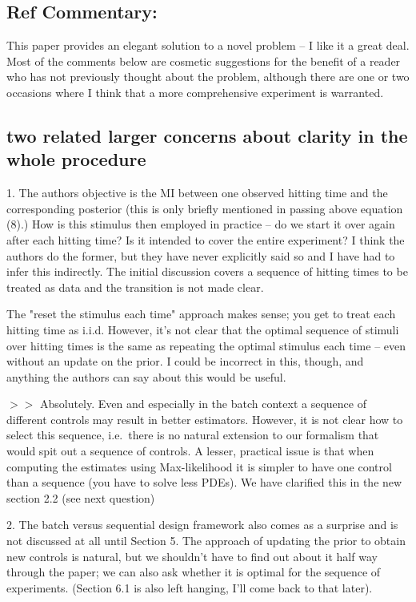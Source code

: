 \documentclass[12pt]{article}
\begin{document}
\subsection{Ref Commentary:}
 This paper provides an elegant solution to a novel problem -- I like it a great
 deal. Most of the comments below are cosmetic suggestions for the benefit of a
 reader who has not previously thought about the problem, although there are one
 or two occasions where I think that a more comprehensive experiment is
 warranted.
 
\subsection{two related larger concerns about clarity in the whole
procedure}

1. The authors objective is the MI between one observed hitting time and
the corresponding posterior (this is only briefly mentioned in passing
above equation (8).) How is this stimulus then employed in practice --
do we start it over again after each hitting time? Is it intended to
cover the entire experiment? I think the authors do the former, but they
have never explicitly said so and I have had to infer this indirectly.
The initial discussion covers a sequence of hitting times to be treated
as data and the transition is not made clear.

The "reset the stimulus each time" approach makes sense; you get to treat each
hitting time as i.i.d. However, it's not clear that the optimal sequence of
stimuli over hitting times is the same as repeating the optimal stimulus each
time -- even without an update on the prior. I could be incorrect in this,
though, and anything the authors can say about this would be useful.


$>>$ Absolutely. Even and especially in the batch context a sequence of
different controls may result in better estimators. However, it is not clear how
to select this sequence, i.e.\ there is no natural extension to our formalism
that would spit out a sequence of controls. A lesser, practical issue is that
when computing the estimates using Max-likelihood it is simpler to have one
control than a sequence (you have to solve less PDEs). 
We have clarified this in the new section 2.2 (see next question)


2. The batch versus sequential design framework also comes as a surprise
and is not discussed at all until Section 5. The approach of updating
the prior to obtain new controls is natural, but we shouldn't have to
find out about it half way through the paper; we can also ask whether it
is optimal for the sequence of experiments. (Section 6.1 is also left
hanging, I'll come back to that later).
\end{document}
